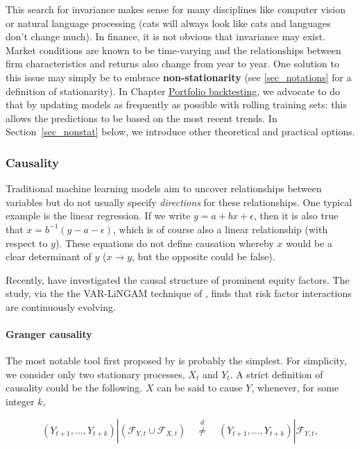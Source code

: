 This search for invariance makes sense for many disciplines like computer vision or natural language processing (cats will always look like cats and languages don't change much). In finance, it is not obvious that invariance may exist. Market conditions are known to be time-varying and the relationships between firm characteristics and returns also change from year to year. One solution to this issue may simply be to embrace \textbf{non-stationarity} (see \ref{sec_notations} for a definition of stationarity). In Chapter \href{/chap-15-portfolio-backtesting}{Portfolio backtesting}, we advocate to do that by updating models as frequently as possible with rolling training sets: this allows the predictions to be based on the most recent trends. In Section~\ref{sec_nonstat} below, we introduce other theoretical and practical options.

\subsubsection{Causality}

Traditional machine learning models aim to uncover relationships between variables but do not usually specify \textit{directions} for these relationships. One typical example is the linear regression. If we write $y=a+bx+\epsilon$, then it is also true that $x=b^{ -1}(y -a -\epsilon)$, which is of course also a linear relationship (with respect to $y$). These equations do not define causation whereby $x$ would be a clear determinant of $y$ ($x \rightarrow y$, but the opposite could be false).

Recently, \cite{dacunto2021evolving} have investigated the causal structure of prominent equity factors. The study, via the the VAR-LiNGAM technique of \cite{hyvarinen2010estimation}, finds that risk factor interactions are continuously evolving.

\paragraph{Granger causality}\label{sec_granger}

The most notable tool first proposed by \cite{granger1969investigating} is probably the simplest. For simplicity, we consider only two stationary processes, $X_t$ and $Y_t$. A strict definition of causality could be the following. $X$ can be said to cause $Y$, whenever, for some integer $k$,

\begin{equation}
(Y_{t+1},\dots,Y_{t+k})|(\mathcal{F}_{Y,t}\cup \mathcal{F}_{X,t}) \quad  \overset{d}{\neq} \quad (Y_{t+1},\dots,Y_{t+k})|\mathcal{F}_{Y,t},
\end{equation}

